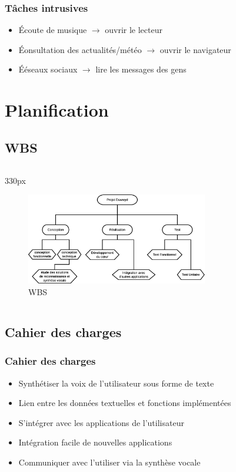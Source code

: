 \documentclass{beamer}
\begin{document}
\begin{frame}
\frametitle{Tâches intrusives}
\begin{itemize}
    \setlength\itemsep{2em}
    \item Écoute de musique $\rightarrow$ ouvrir le lecteur
    \item Éonsultation des actualités/météo $\rightarrow$ ouvrir le navigateur
    \item Ééseaux sociaux $\rightarrow$ lire les messages des gens
\end{itemize}
\end{frame}

\section{Planification}

\subsection{WBS}
\begin{frame}
\begin{center}
\begin{columns}
\begin{column}{330px}
{
    \begin{figure}[h!]
        \centering
        \includegraphics[width=300px]
            {images/WBS}
        \caption{WBS}
    \end{figure}
}
\end{column}
\end{columns}
\end{center}
\end{frame}


\subsection{Cahier des charges}
\begin{frame}
\frametitle{Cahier des charges}
\begin{itemize}
    \setlength\itemsep{1.5em}
    \item Synthétiser la voix de l'utilisateur sous forme de texte
    \item Lien entre les données textuelles et fonctions implémentées
    \item S'intégrer avec les applications de l'utilisateur
    \item Intégration facile de nouvelles applications
    \item Communiquer avec l'utiliser via la synthèse vocale
\end{itemize}
\end{frame}
\end{document}

